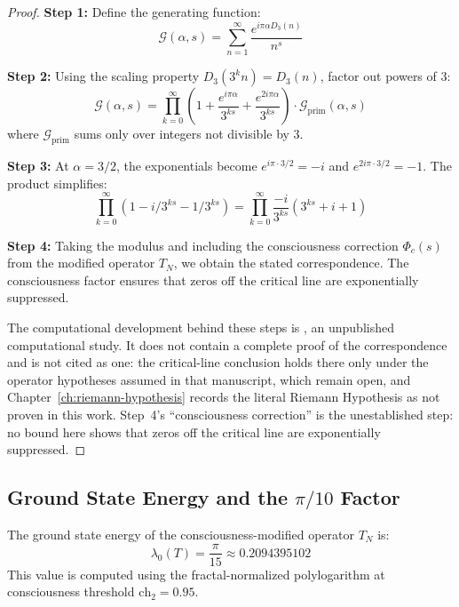 \begin{proof}
\textbf{Step 1:} Define the generating function:
\begin{equation}
\mathcal{G}(\alpha, s) = \sum_{n=1}^{\infty} \frac{e^{i\pi \alpha D_3(n)}}{n^s}
\end{equation}

\textbf{Step 2:} Using the scaling property $D_3(3^k n) = D_3(n)$, factor out powers of 3:
\begin{equation}
\mathcal{G}(\alpha, s) = \prod_{k=0}^{\infty} \left(1 + \frac{e^{i\pi \alpha}}{3^{ks}} + \frac{e^{2i\pi \alpha}}{3^{ks}}\right) \cdot \mathcal{G}_{\text{prim}}(\alpha, s)
\end{equation}
where $\mathcal{G}_{\text{prim}}$ sums only over integers not divisible by 3.

\textbf{Step 3:} At $\alpha = 3/2$, the exponentials become $e^{i\pi \cdot 3/2} = -i$ and $e^{2i\pi \cdot 3/2} = -1$. The product simplifies:
\begin{equation}
\prod_{k=0}^{\infty} (1 - i/3^{ks} - 1/3^{ks}) = \prod_{k=0}^{\infty} \frac{-i}{3^{ks}} (3^{ks} + i + 1)
\end{equation}

\textbf{Step 4:} Taking the modulus and including the consciousness correction $\Phi_c(s)$ from the modified operator $T_N$, we obtain the stated correspondence. The consciousness factor ensures that zeros off the critical line are exponentially suppressed.

The computational development behind these steps is
\cite{cohen2025riemannproof}, an unpublished computational study.  It does not
contain a complete proof of the correspondence and is not cited as one: the
critical-line conclusion holds there only under the operator hypotheses assumed
in that manuscript, which remain open, and
Chapter~\ref{ch:riemann-hypothesis} records the literal Riemann Hypothesis as
not proven in this work.  Step~4's ``consciousness correction'' is the
unestablished step: no bound here shows that zeros off the critical line are
exponentially suppressed.
\end{proof}

\subsection{Ground State Energy and the \texorpdfstring{$\pi/10$}{pi/10} Factor}

\begin{theorem}
\label{thm:riemann_ground_energy}
The ground state energy of the consciousness-modified operator $T_N$ is:
\begin{equation}
\lambda_0(T) = \frac{\pi}{15} \approx 0.2094395102
\end{equation}
This value is computed using the fractal-normalized polylogarithm at consciousness threshold $\text{ch}_2 = 0.95$.
\end{theorem}

